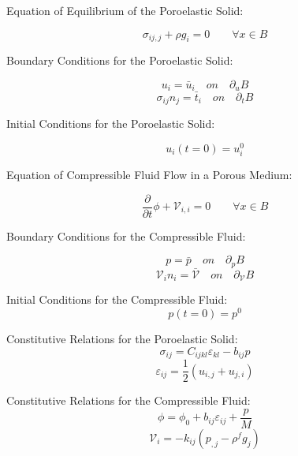 \documentclass[11pt]{article} %
\begin{document}
Equation of Equilibrium of the Poroelastic Solid:

\begin{equation}
	\sigma_{ij,j} + \rho g_i = 0 \qquad \forall x \in B
\end{equation}

Boundary Conditions for the Poroelastic Solid:

\begin{equation}
	u_i = \bar{u}_i \quad on \quad \partial_u B
\end{equation}
\begin{equation}
	\sigma_{ij} n_j = \bar{t}_i \quad on \quad \partial_t B
\end{equation}

Initial Conditions for the Poroelastic Solid:

\begin{equation}
	u_i (t=0) = u_i^0
\end{equation}

Equation of Compressible Fluid Flow in a Porous Medium:

\begin{equation}
	\frac{\partial}{\partial t} \phi + \mathcal{V}_{i,i} = 0 \qquad \forall x \in B
\end{equation}

Boundary Conditions for the Compressible Fluid:

\begin{equation}
	p = \bar{p} \quad on \quad \partial_p B
\end{equation}
\begin{equation}
	\mathcal{V}_i n_i = \bar{\mathcal{V}} \quad on \quad \partial_{\mathcal{V}} B
\end{equation}

Initial Conditions for the Compressible Fluid:
\begin{equation}
	p (t=0) = p^0
\end{equation}

Constitutive Relations for the Poroelastic Solid:
\begin{equation}
	\sigma_{ij} = C_{ijkl} \varepsilon_{kl} - b_{ij} p
\end{equation}
\begin{equation}
	\varepsilon_{ij} = \frac{1}{2} (u_{i,j}+u_{j,i})
\end{equation}

Constitutive Relations for the Compressible Fluid:
\begin{equation}
	\phi = \phi_0 + b_{ij} \varepsilon_{ij} + \frac{p}{M}
	\label{eq:phi}
\end{equation}
\begin{equation}
	\mathcal{V}_i = -k_{ij} ( p_{,j} - \rho^f g_j )
\end{equation}
\end{document}

